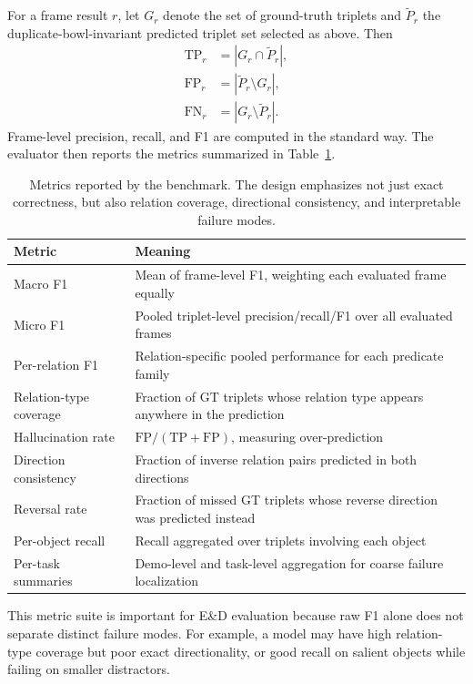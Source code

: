 \documentclass{article}
\begin{document}
For a frame result $r$, let $G_r$ denote the set of ground-truth triplets and $\tilde{P}_r$ the duplicate-bowl-invariant predicted triplet set selected as above. Then
\begin{align}
\mathrm{TP}_r &= |G_r \cap \tilde{P}_r|, \\
\mathrm{FP}_r &= |\tilde{P}_r \setminus G_r|, \\
\mathrm{FN}_r &= |G_r \setminus \tilde{P}_r|.
\end{align}
Frame-level precision, recall, and F1 are computed in the standard way. The evaluator then reports the metrics summarized in Table~\ref{tab:metrics}.

\begin{table}[t]
    \caption{Metrics reported by the benchmark. The design emphasizes not just exact correctness, but also relation coverage, directional consistency, and interpretable failure modes.}
    \label{tab:metrics}
    \centering
    \begin{tabularx}{\linewidth}{lX}
        \toprule
        Metric & Meaning \\
        \midrule
        Macro F1 & Mean of frame-level F1, weighting each evaluated frame equally \\
        Micro F1 & Pooled triplet-level precision/recall/F1 over all evaluated frames \\
        Per-relation F1 & Relation-specific pooled performance for each predicate family \\
        Relation-type coverage & Fraction of GT triplets whose relation type appears anywhere in the prediction \\
        Hallucination rate & $\mathrm{FP}/(\mathrm{TP}+\mathrm{FP})$, measuring over-prediction \\
        Direction consistency & Fraction of inverse relation pairs predicted in both directions \\
        Reversal rate & Fraction of missed GT triplets whose reverse direction was predicted instead \\
        Per-object recall & Recall aggregated over triplets involving each object \\
        Per-task summaries & Demo-level and task-level aggregation for coarse failure localization \\
        \bottomrule
    \end{tabularx}
\end{table}

This metric suite is important for E\&D evaluation because raw F1 alone does not separate distinct failure modes. For example, a model may have high relation-type coverage but poor exact directionality, or good recall on salient objects while failing on smaller distractors.
\end{document}
